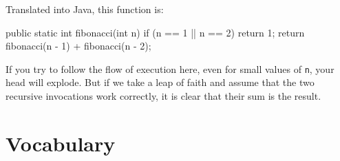 \documentclass[12pt]{book}
\theoremstyle{exercise}
\newcommand{\java}[1]{\verb"#1"}
\begin{document}
Translated into Java, this function is:

\begin{code}
    public static int fibonacci(int n) {
        if (n == 1 || n == 2) {
            return 1;
        }
        return fibonacci(n - 1) + fibonacci(n - 2);
    }
\end{code}

If you try to follow the flow of execution here, even for small values of \java{n}, your head will explode.
But if we take a leap of faith and assume that the two recursive invocations work correctly, it is clear that their sum is the result.



\section{Vocabulary}
\end{document}
